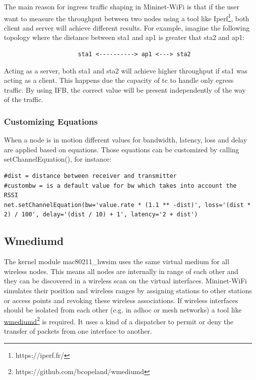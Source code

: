 The main reason for ingress traffic shaping in Mininet-WiFi is that if the user want to measure the throughput between two nodes using a tool like Iperf\footnote{https://iperf.fr/}, both client and server will achieve different results. For example, imagine the following topology where the distance between sta1 and ap1 is greater that sta2 and ap1:

\begin{verbatim}
                     sta1 <----------> ap1 <---> sta2
\end{verbatim}

Acting as a server, both sta1 and sta2 will achieve higher throughput if sta1 was acting as a client. This happens due the capacity of tc to handle only egress traffic. By using IFB, the correct value will be present independently of the way of the traffic.

\subsubsection{Customizing Equations}
When a node is in motion different values for bandwidth, latency, loss and delay are applied based on equations. Those equations can be customized by calling setChannelEquation(), for instance:

\begin{verbatim}
#dist = distance between receiver and transmitter
#custombw = is a default value for bw which takes into account the RSSI
net.setChannelEquation(bw='value.rate * (1.1 ** -dist)', loss='(dist * 2) / 100', delay='(dist / 10) + 1', latency='2 + dist')
\end{verbatim}
             

\subsection{Wmediumd}\label{wmediumd}
The kernel module mac80211\_hwsim uses the same virtual medium for all wireless nodes. This means all nodes are internally in range of each other and they can be discovered in a wireless scan on the virtual interfaces. Mininet-WiFi simulates their position and wireless ranges by assigning stations to other stations or access points and revoking these wireless associations. If wireless interfaces should be isolated from each other (e.g. in adhoc or mesh networks) a tool like \underline{\href{https://github.com/bcopeland/wmediumd}{wmediumd}}\footnote{https://github.com/bcopeland/wmediumd} is required. It uses a kind of a dispatcher to permit or deny the transfer of packets from one interface to another.

